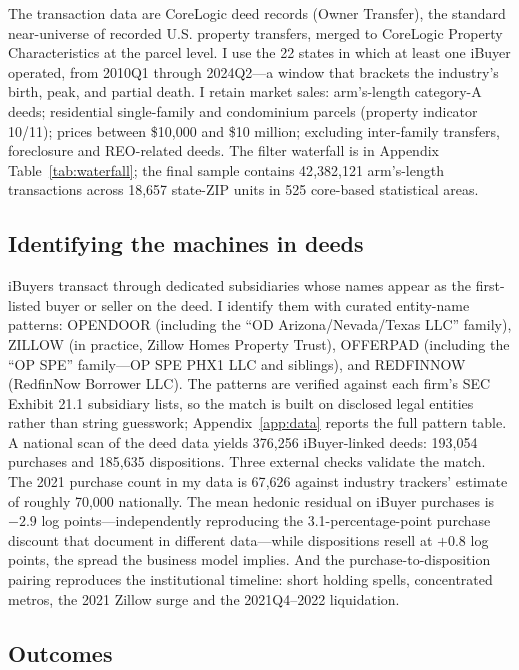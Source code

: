 \documentclass[12pt, letterpaper]{article}
\theoremstyle{remark}
\begin{document}
The transaction data are CoreLogic deed records (Owner Transfer), the standard near-universe of recorded U.S. property transfers, merged to CoreLogic Property Characteristics at the parcel level. I use the 22 states in which at least one iBuyer operated, from 2010Q1 through 2024Q2---a window that brackets the industry's birth, peak, and partial death. I retain market sales: arm's-length category-A deeds; residential single-family and condominium parcels (property indicator 10/11); prices between \$10{,}000 and \$10 million; excluding inter-family transfers, foreclosure and REO-related deeds. The filter waterfall is in Appendix Table~\ref{tab:waterfall}; the final sample contains 42{,}382{,}121 arm's-length transactions across 18{,}657 state-ZIP units in 525 core-based statistical areas.

\subsection{Identifying the machines in deeds}\label{sec:data-ibuyers}

iBuyers transact through dedicated subsidiaries whose names appear as the first-listed buyer or seller on the deed. I identify them with curated entity-name patterns: OPENDOOR (including the ``OD Arizona/Nevada/Texas LLC'' family), ZILLOW (in practice, Zillow Homes Property Trust), OFFERPAD (including the ``OP SPE'' family---OP SPE PHX1 LLC and siblings), and REDFINNOW (RedfinNow Borrower LLC). The patterns are verified against each firm's SEC Exhibit 21.1 subsidiary lists, so the match is built on disclosed legal entities rather than string guesswork; Appendix~\ref{app:data} reports the full pattern table. A national scan of the deed data yields 376{,}256 iBuyer-linked deeds: 193{,}054 purchases and 185{,}635 dispositions. Three external checks validate the match. The 2021 purchase count in my data is 67{,}626 against industry trackers' estimate of roughly 70{,}000 nationally. The mean hedonic residual on iBuyer purchases is $-2.9$ log points---independently reproducing the 3.1-percentage-point purchase discount that \citet{buchak2025intermediating} document in different data---while dispositions resell at $+0.8$ log points, the spread the business model implies. And the purchase-to-disposition pairing reproduces the institutional timeline: short holding spells, concentrated metros, the 2021 Zillow surge and the 2021Q4--2022 liquidation.

\subsection{Outcomes}\label{sec:data-outcomes}
\end{document}

